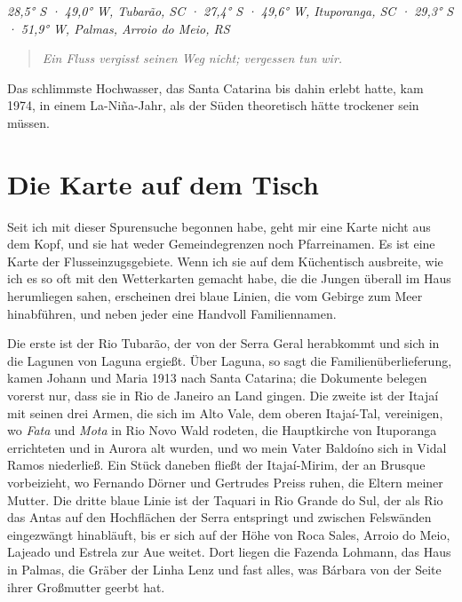 \documentclass[
  ngerman,
  11pt,
  openany]{book}
\begin{document}
\emph{28,5° S · 49,0° W, Tubarão, SC · 27,4° S · 49,6° W, Ituporanga, SC
· 29,3° S · 51,9° W, Palmas, Arroio do Meio, RS}

\begin{quote}
\emph{Ein Fluss vergisst seinen Weg nicht; vergessen tun wir.}
\end{quote}

Das schlimmste Hochwasser, das Santa Catarina bis dahin erlebt hatte,
kam 1974, in einem La-Niña-Jahr, als der Süden theoretisch hätte
trockener sein müssen.

\section{Die Karte auf dem Tisch}\label{die-karte-auf-dem-tisch}

Seit ich mit dieser Spurensuche begonnen habe, geht mir eine Karte nicht
aus dem Kopf, und sie hat weder Gemeindegrenzen noch Pfarreinamen. Es
ist eine Karte der Flusseinzugsgebiete. Wenn ich sie auf dem Küchentisch
ausbreite, wie ich es so oft mit den Wetterkarten gemacht habe, die die
Jungen überall im Haus herumliegen sahen, erscheinen drei blaue Linien,
die vom Gebirge zum Meer hinabführen, und neben jeder eine Handvoll
Familiennamen.

Die erste ist der Rio Tubarão, der von der Serra Geral herabkommt und
sich in die Lagunen von Laguna ergießt. Über Laguna, so sagt die
Familienüberlieferung, kamen Johann und Maria 1913 nach Santa Catarina;
die Dokumente belegen vorerst nur, dass sie in Rio de Janeiro an Land
gingen. Die zweite ist der Itajaí mit seinen drei Armen, die sich im
Alto Vale, dem oberen Itajaí-Tal, vereinigen, wo \emph{Fata} und
\emph{Mota} in Rio Novo Wald rodeten, die Hauptkirche von Ituporanga
errichteten und in Aurora alt wurden, und wo mein Vater Baldoíno sich in
Vidal Ramos niederließ. Ein Stück daneben fließt der Itajaí-Mirim, der
an Brusque vorbeizieht, wo Fernando Dörner und Gertrudes Preiss ruhen,
die Eltern meiner Mutter. Die dritte blaue Linie ist der Taquari in Rio
Grande do Sul, der als Rio das Antas auf den Hochflächen der Serra
entspringt und zwischen Felswänden eingezwängt hinabläuft, bis er sich
auf der Höhe von Roca Sales, Arroio do Meio, Lajeado und Estrela zur Aue
weitet. Dort liegen die Fazenda Lohmann, das Haus in Palmas, die Gräber
der Linha Lenz und fast alles, was Bárbara von der Seite ihrer
Großmutter geerbt hat.
\end{document}
